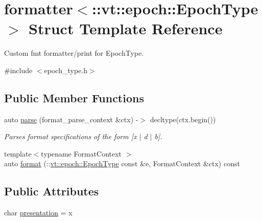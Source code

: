 \hypertarget{structformatter_3_1_1vt_1_1epoch_1_1_epoch_type_01_4}{}\section{formatter$<$\+:\+:vt\+:\+:epoch\+:\+:Epoch\+Type $>$ Struct Template Reference}
\label{structformatter_3_1_1vt_1_1epoch_1_1_epoch_type_01_4}


Custom fmt formatter/print for {\ttfamily Epoch\+Type}.  




{\ttfamily \#include $<$epoch\+\_\+type.\+h$>$}

\subsection*{Public Member Functions}
\begin{DoxyCompactItemize}
\item 
auto \hyperlink{structformatter_3_1_1vt_1_1epoch_1_1_epoch_type_01_4_aa731ea05b5a847af0606767b933063f0}{parse} (format\+\_\+parse\+\_\+context \&ctx) -\/$>$ decltype(ctx.\+begin())
\begin{DoxyCompactList}\small\item\em Parses format specifications of the form \mbox{[}\textquotesingle{}x\textquotesingle{} $\vert$ \textquotesingle{}d\textquotesingle{} $\vert$ \textquotesingle{}b\textquotesingle{}\mbox{]}. \end{DoxyCompactList}\item 
{\footnotesize template$<$typename Format\+Context $>$ }\\auto \hyperlink{structformatter_3_1_1vt_1_1epoch_1_1_epoch_type_01_4_a3cb576a964fb01c01250ae6d3f4c5034}{format} (\+::\hyperlink{structvt_1_1epoch_1_1_epoch_type}{vt\+::epoch\+::\+Epoch\+Type} const \&e, Format\+Context \&ctx) const
\end{DoxyCompactItemize}
\subsection*{Public Attributes}
\begin{DoxyCompactItemize}
\item 
char \hyperlink{structformatter_3_1_1vt_1_1epoch_1_1_epoch_type_01_4_a97209524e3ceb2d868c2b11d94f507c0}{presentation} = \textquotesingle{}x\textquotesingle{}
\end{DoxyCompactItemize}


